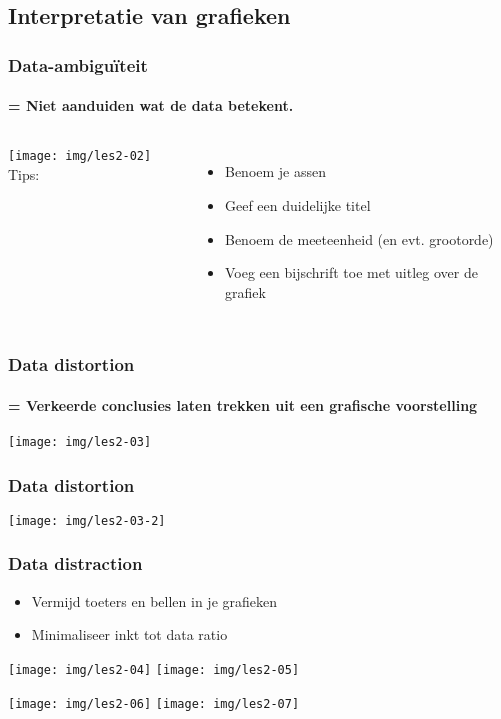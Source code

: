 \documentclass[aspectratio=169]{beamer}
\begin{document}
\subsection{Interpretatie van grafieken}

\begin{frame}
  \frametitle{Data-ambiguïteit}
  \framesubtitle{= Niet aanduiden wat de data betekent.}

  \begin{columns}
    \texttt{[image: img/les2-02]}
    Tips:
    \begin{itemize}
      \item Benoem je assen
      \item Geef een duidelijke titel
      \item Benoem de meeteenheid (en evt. grootorde)
      \item Voeg een bijschrift toe met uitleg over de grafiek
    \end{itemize}
  \end{columns}
\end{frame}

\begin{frame}
  \frametitle{Data distortion}
\framesubtitle{= Verkeerde conclusies laten trekken uit een grafische voorstelling}

  \bigskip

  \begin{center}
    \texttt{[image: img/les2-03]}
  \end{center}
\end{frame}

\begin{frame}
  \frametitle{Data distortion}

  \begin{center}
    \texttt{[image: img/les2-03-2]}
  \end{center}
\end{frame}

\begin{frame}
  \frametitle{Data distraction}

  \begin{itemize}
    \item Vermijd toeters en bellen in je grafieken
    \item Minimaliseer inkt tot data ratio
  \end{itemize}

  \centering
  \texttt{[image: img/les2-04]}
  \texttt{[image: img/les2-05]}

  \texttt{[image: img/les2-06]}
  \texttt{[image: img/les2-07]}
\end{frame}
\end{document}
